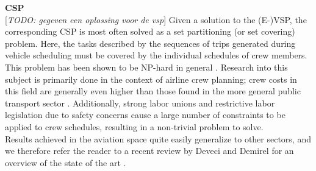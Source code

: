 \documentclass[]{article}
\newcommand{\todo}[1]{{\color{red}[\textit{TODO: #1}]}}
\begin{document}
\noindent \textbf{CSP}\\
\todo{gegeven een oplossing voor de vsp}
Given a solution to the (E-)VSP, the corresponding CSP is most often solved as a set partitioning (or set covering) problem. Here, the tasks described by the sequences of trips generated during vehicle scheduling must be covered by the individual schedules of crew members. This problem has been shown to be NP-hard in general \citet{Fischetti1989}. Research into this subject is primarily done in the context of airline crew planning; crew costs in this field are generally even higher than those found in the more general public transport sector \citet{Barnhart2003}. Additionally, strong labor unions and restrictive labor legislation due to safety concerns cause a large number of constraints to be applied to crew schedules, resulting in a non-trivial problem to solve. \\
Results achieved in the aviation space quite easily generalize to other sectors, and we therefore refer the reader to a recent review by Deveci and Demirel for an overview of the state of the art \citet{Deveci2018}. \\\\
\end{document}
